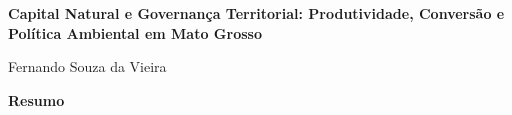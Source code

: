 \documentclass[a4paper,12pt,twoside,brazil]{abntex2}
\begin{document}
\begin{center}
    {\Large \bfseries Capital Natural e Governança Territorial: Produtividade, Conversão e Política Ambiental em Mato Grosso }\par\vspace{0.8cm}
    Fernando Souza da Vieira
\end{center}

\vspace{0.8cm}

\noindent\textbf{Resumo}











\nocite{*}


\end{document}
